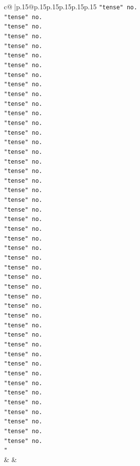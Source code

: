 \documentclass{article}
\begin{document}
{\begin{supertabular}{c@{$\;$}|p{.15\linewidth}@{}p{.15\linewidth}p{.15\linewidth}p{.15\linewidth}p{.15\linewidth}p{.15\linewidth}}
{{{\texttt{"tense" no.} \\
\texttt{"tense" no.} \\
\texttt{"tense" no.} \\
\texttt{"tense" no.} \\
\texttt{"tense" no.} \\
\texttt{"tense" no.} \\
\texttt{"tense" no.} \\
\texttt{"tense" no.} \\
\texttt{"tense" no.} \\
\texttt{"tense" no.} \\
\texttt{"tense" no.} \\
\texttt{"tense" no.} \\
\texttt{"tense" no.} \\
\texttt{"tense" no.} \\
\texttt{"tense" no.} \\
\texttt{"tense" no.} \\
\texttt{"tense" no.} \\
\texttt{"tense" no.} \\
\texttt{"tense" no.} \\
\texttt{"tense" no.} \\
\texttt{"tense" no.} \\
\texttt{"tense" no.} \\
\texttt{"tense" no.} \\
\texttt{"tense" no.} \\
\texttt{"tense" no.} \\
\texttt{"tense" no.} \\
\texttt{"tense" no.} \\
\texttt{"tense" no.} \\
\texttt{"tense" no.} \\
\texttt{"tense" no.} \\
\texttt{"tense" no.} \\
\texttt{"tense" no.} \\
\texttt{"tense" no.} \\
\texttt{"tense" no.} \\
\texttt{"tense" no.} \\
\texttt{"tense" no.} \\
\texttt{"tense" no.} \\
\texttt{"tense" no.} \\
\texttt{"tense" no.} \\
\texttt{"tense" no.} \\
\texttt{"tense" no.} \\
\texttt{"tense" no.} \\
\texttt{"tense" no.} \\
\texttt{"tense" no.} \\
\texttt{"tense" no.} \\
\texttt{"tense" no.} \\
\texttt{"} \\
            }
        }
    }
    & & \\ \\


\end{supertabular}}
\end{document}
